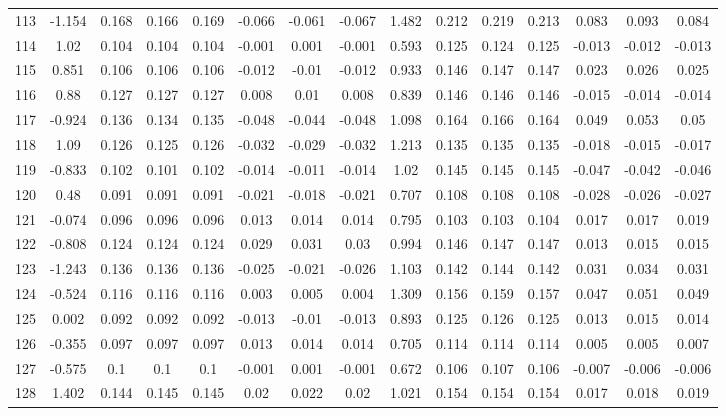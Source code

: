 \begin{table}[H]
{\begin{tabular}{l|c|ccc|ccc|c|ccc|ccc}
			113 & -1.154 & 0.168 & 0.166 & 0.169 & -0.066 & -0.061 & -0.067 & 1.482 & 0.212 & 0.219 & 0.213 & 0.083 & 0.093 & 0.084 \\
			114 & 1.02 & 0.104 & 0.104 & 0.104 & -0.001 & 0.001 & -0.001 & 0.593 & 0.125 & 0.124 & 0.125 & -0.013 & -0.012 & -0.013 \\
			115 & 0.851 & 0.106 & 0.106 & 0.106 & -0.012 & -0.01 & -0.012 & 0.933 & 0.146 & 0.147 & 0.147 & 0.023 & 0.026 & 0.025 \\
			116 & 0.88 & 0.127 & 0.127 & 0.127 & 0.008 & 0.01 & 0.008 & 0.839 & 0.146 & 0.146 & 0.146 & -0.015 & -0.014 & -0.014 \\
			117 & -0.924 & 0.136 & 0.134 & 0.135 & -0.048 & -0.044 & -0.048 & 1.098 & 0.164 & 0.166 & 0.164 & 0.049 & 0.053 & 0.05 \\
			118 & 1.09 & 0.126 & 0.125 & 0.126 & -0.032 & -0.029 & -0.032 & 1.213 & 0.135 & 0.135 & 0.135 & -0.018 & -0.015 & -0.017 \\
			119 & -0.833 & 0.102 & 0.101 & 0.102 & -0.014 & -0.011 & -0.014 & 1.02 & 0.145 & 0.145 & 0.145 & -0.047 & -0.042 & -0.046 \\
			120 & 0.48 & 0.091 & 0.091 & 0.091 & -0.021 & -0.018 & -0.021 & 0.707 & 0.108 & 0.108 & 0.108 & -0.028 & -0.026 & -0.027 \\
			121 & -0.074 & 0.096 & 0.096 & 0.096 & 0.013 & 0.014 & 0.014 & 0.795 & 0.103 & 0.103 & 0.104 & 0.017 & 0.017 & 0.019 \\
			122 & -0.808 & 0.124 & 0.124 & 0.124 & 0.029 & 0.031 & 0.03 & 0.994 & 0.146 & 0.147 & 0.147 & 0.013 & 0.015 & 0.015 \\
			123 & -1.243 & 0.136 & 0.136 & 0.136 & -0.025 & -0.021 & -0.026 & 1.103 & 0.142 & 0.144 & 0.142 & 0.031 & 0.034 & 0.031 \\
			124 & -0.524 & 0.116 & 0.116 & 0.116 & 0.003 & 0.005 & 0.004 & 1.309 & 0.156 & 0.159 & 0.157 & 0.047 & 0.051 & 0.049 \\
			125 & 0.002 & 0.092 & 0.092 & 0.092 & -0.013 & -0.01 & -0.013 & 0.893 & 0.125 & 0.126 & 0.125 & 0.013 & 0.015 & 0.014 \\
			126 & -0.355 & 0.097 & 0.097 & 0.097 & 0.013 & 0.014 & 0.014 & 0.705 & 0.114 & 0.114 & 0.114 & 0.005 & 0.005 & 0.007 \\
			127 & -0.575 & 0.1 & 0.1 & 0.1 & -0.001 & 0.001 & -0.001 & 0.672 & 0.106 & 0.107 & 0.106 & -0.007 & -0.006 & -0.006 \\
			128 & 1.402 & 0.144 & 0.145 & 0.145 & 0.02 & 0.022 & 0.02 & 1.021 & 0.154 & 0.154 & 0.154 & 0.017 & 0.018 & 0.019 \\

\end{tabular}}
\end{table}
